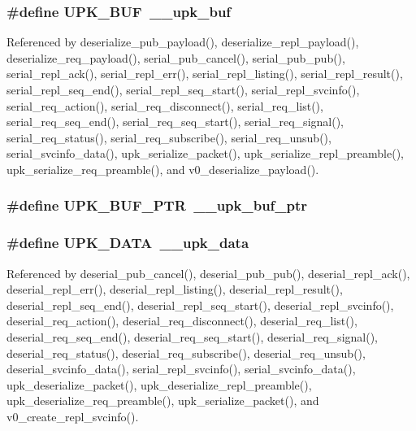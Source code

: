 \subsubsection[{UPK\_\-BUF}]{\setlength{\rightskip}{0pt plus 5cm}\#define UPK\_\-BUF~\_\-\_\-upk\_\-buf}\label{group__client__protocol_ga2f8e3fdadca458dd0df4929c67687354}


Referenced by deserialize\_\-pub\_\-payload(), deserialize\_\-repl\_\-payload(), deserialize\_\-req\_\-payload(), serial\_\-pub\_\-cancel(), serial\_\-pub\_\-pub(), serial\_\-repl\_\-ack(), serial\_\-repl\_\-err(), serial\_\-repl\_\-listing(), serial\_\-repl\_\-result(), serial\_\-repl\_\-seq\_\-end(), serial\_\-repl\_\-seq\_\-start(), serial\_\-repl\_\-svcinfo(), serial\_\-req\_\-action(), serial\_\-req\_\-disconnect(), serial\_\-req\_\-list(), serial\_\-req\_\-seq\_\-end(), serial\_\-req\_\-seq\_\-start(), serial\_\-req\_\-signal(), serial\_\-req\_\-status(), serial\_\-req\_\-subscribe(), serial\_\-req\_\-unsub(), serial\_\-svcinfo\_\-data(), upk\_\-serialize\_\-packet(), upk\_\-serialize\_\-repl\_\-preamble(), upk\_\-serialize\_\-req\_\-preamble(), and v0\_\-deserialize\_\-payload().

\subsubsection[{UPK\_\-BUF\_\-PTR}]{\setlength{\rightskip}{0pt plus 5cm}\#define UPK\_\-BUF\_\-PTR~\_\-\_\-upk\_\-buf\_\-ptr}\label{group__client__protocol_gaf916eeceef858d64ba063052210159f9}
\subsubsection[{UPK\_\-DATA}]{\setlength{\rightskip}{0pt plus 5cm}\#define UPK\_\-DATA~\_\-\_\-upk\_\-data}\label{group__client__protocol_ga3c63e3d81e8528b3300170bb020ef84b}


Referenced by deserial\_\-pub\_\-cancel(), deserial\_\-pub\_\-pub(), deserial\_\-repl\_\-ack(), deserial\_\-repl\_\-err(), deserial\_\-repl\_\-listing(), deserial\_\-repl\_\-result(), deserial\_\-repl\_\-seq\_\-end(), deserial\_\-repl\_\-seq\_\-start(), deserial\_\-repl\_\-svcinfo(), deserial\_\-req\_\-action(), deserial\_\-req\_\-disconnect(), deserial\_\-req\_\-list(), deserial\_\-req\_\-seq\_\-end(), deserial\_\-req\_\-seq\_\-start(), deserial\_\-req\_\-signal(), deserial\_\-req\_\-status(), deserial\_\-req\_\-subscribe(), deserial\_\-req\_\-unsub(), deserial\_\-svcinfo\_\-data(), serial\_\-repl\_\-svcinfo(), serial\_\-svcinfo\_\-data(), upk\_\-deserialize\_\-packet(), upk\_\-deserialize\_\-repl\_\-preamble(), upk\_\-deserialize\_\-req\_\-preamble(), upk\_\-serialize\_\-packet(), and v0\_\-create\_\-repl\_\-svcinfo().

